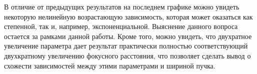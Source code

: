 {    В отличие от предыдущих результатов на последнем графике можно увидеть некоторую нелинейную возрастающую зависимость, которая
    может оказаться как степенной, так и, например, экспоненциальной. Выяснение данного вопроса остается за рамками данной работы.
    Кроме того, можно увидеть, что двухратное увеличение параметра дает результат практически полностью соответствующий двухкратному увеличению фокусного расстояния,
    что позволяет сделать вывод о схожести зависимостей между этими параметрами и шириной пучка.


%
%
%
%
%
}
